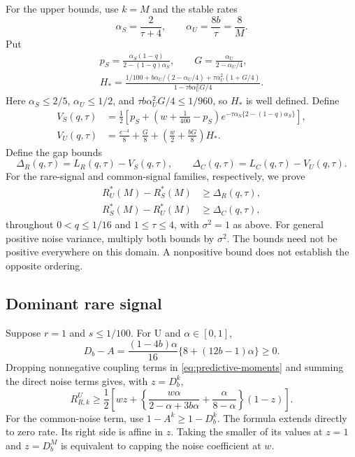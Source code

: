 \documentclass{alt2027}
\begin{document}
For the upper bounds, use $k = M$ and the stable rates
\[
  \alpha_S = \frac{2}{\tau + 4},\qquad \alpha_U = \frac{8b}{\tau} = \frac8M.
\]
Put
\[
  \begin{gathered}
    p_S = \frac{\alpha_S(1 - q)}{2 - (1 - q)\alpha_S},\qquad G = \frac{\alpha_U}{2 - \alpha_U/4}, \\
    H_* = \frac{1/100 + b\alpha_U/(2 - \alpha_U/4) + \tau\alpha_U^2(1 + G/4)}
               {1 - \tau b\alpha_U^2G/4}.
  \end{gathered}
\]
Here $\alpha_S \leq 2/5$, $\alpha_U \leq 1/2$, and
$\tau b\alpha_U^2G/4 \leq 1/960$, so $H_*$ is well defined. Define
\begin{equation}
  \begin{aligned}
    V_S(q,\tau) & = \frac12\left[ p_S + \left( w + \frac1{400} - p_S \right) e^{-\tau\alpha_S\{2-(1-q)\alpha_S\}} \right], \\
    V_U(q,\tau) & = \frac{e^{-4}}8 + \frac G8 + \left( \frac w2 + \frac{bG}8 \right)H_*.
  \end{aligned}
\end{equation}
Define the gap bounds
\begin{equation}
  \Delta_R(q,\tau) = L_R(q,\tau) - V_S(q,\tau),\qquad \Delta_C(q,\tau)
                   = L_C(q,\tau) - V_U(q,\tau).
\end{equation}
For the rare-signal and common-signal families, respectively, we prove
\begin{equation}
  \begin{aligned}
    R_U^*(M) - R_S^*(M) & \geq \Delta_R(q,\tau), \\
    R_S^*(M) - R_U^*(M) & \geq \Delta_C(q,\tau),
  \end{aligned} \label{eq:predictive-oracle-gaps}
\end{equation}
throughout $0 < q \leq 1/16$ and $1 \leq \tau \leq 4$, with $\sigma^2 = 1$ as
above. For general positive noise variance, multiply both bounds by $\sigma^2$.
The bounds need not be positive everywhere on this domain. A nonpositive bound
does not establish the opposite ordering.

\subsection{Dominant rare signal}

Suppose $r = 1$ and $s \leq 1/100$. For U and $\alpha \in[0,1]$,
\[
  D_b - A = \frac{(1 - 4b)\alpha}{16} \{8 + (12b - 1)\alpha\} \geq 0.
\]
Dropping nonnegative coupling terms in \cref{eq:predictive-moments} and summing
the direct noise terms gives, with $z = D_b^k$,
\begin{equation}
  R_{R,k}^U \geq \frac12\left[ wz + \left\{ \frac{w\alpha}{2 - \alpha + 3b\alpha} + \frac{\alpha}{8 - \alpha} \right\}(1 - z) \right].
\end{equation}
For the common-noise term, use $1 - A^k \geq 1 - D_b^k$. The formula extends
directly to zero rate. Its right side is affine in $z$. Taking the smaller of
its values at $z = 1$ and $z = D_b^M$ is equivalent to capping the noise
coefficient at $w$.
\end{document}
